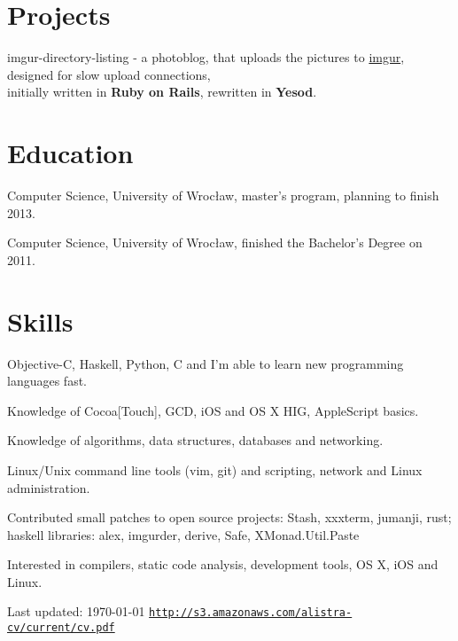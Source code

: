 \documentclass[letterpaper]{article}
\renewenvironment{itemize}{
  \begin{list}{}{
    \setlength{\leftmargin}{1.5em}
  }
}{
  \end{list}
}
\begin{document}
\section*{Projects}
\begin{itemize}
    \item imgur-directory-listing - a photoblog, that uploads the pictures to \href{http://imgur.com}{imgur},
        designed for slow upload connections,\\ initially written in {\bf Ruby on Rails}, rewritten in {\bf Yesod}.
\end{itemize}

\section*{Education}

\begin{itemize}
  	\item Computer Science, University of Wrocław, master's program, planning to finish 2013.
  	\item Computer Science, University of Wrocław, finished the Bachelor's Degree on 2011.
\end{itemize}

\section*{Skills}

\begin{itemize}
	\item Objective-C, Haskell, Python, C and I'm able to learn new programming languages fast.
	\item Knowledge of Cocoa[Touch], GCD, iOS and OS X HIG, AppleScript basics.
	\item Knowledge of algorithms, data structures, databases and networking.
    \item Linux/Unix command line tools (vim, git) and scripting, network and Linux administration.
	\item Contributed small patches to open source projects: Stash, xxxterm, jumanji, rust;\\
		 haskell libraries: alex, imgurder, derive, Safe, XMonad.Util.Paste
	\item Interested in compilers, static code analysis, development tools, OS X, iOS and Linux.
\end{itemize}

\bigskip

\begin{center}
  \begin{footnotesize}
    Last updated: \today
    \hfill
    \href{http://s3.amazonaws.com/alistra-cv/current/cv.pdf}
    {\texttt{http://s3.amazonaws.com/alistra-cv/current/cv.pdf}}
  \end{footnotesize}
\end{center}
\end{document}

